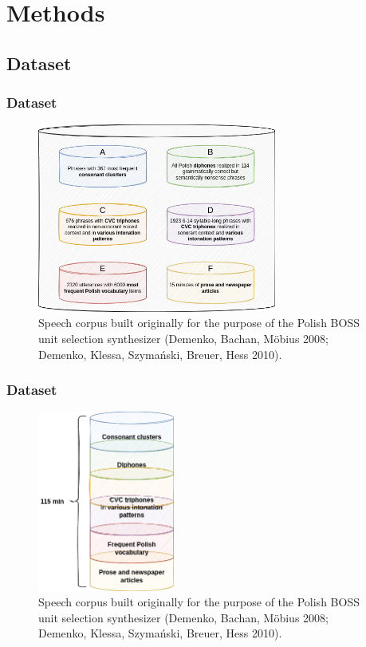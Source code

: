 \documentclass[a4paper,9pt]{beamer}
\theoremstyle{mytheoremstyle}
\begin{document}
\section{Methods}

\subsection{Dataset}

\begin{frame}
\frametitle{Dataset}
\begin{figure}
\begin{center}
  \includegraphics[width=0.7\textwidth]{res/dataset_structure}
\end{center}
	\caption{Speech corpus built originally for the purpose of the Polish BOSS unit selection synthesizer (Demenko, Bachan, M{\"o}bius 2008; Demenko, Klessa, Szyma\'nski, Breuer, Hess 2010).}
\end{figure}
\end{frame}

\begin{frame}
\frametitle{Dataset}
\begin{figure}
\begin{center}
  \includegraphics[width=0.4\textwidth]{res/dataset_structure_simple}
\end{center}
	\caption{Speech corpus built originally for the purpose of the Polish BOSS unit selection synthesizer (Demenko, Bachan, M{\"o}bius 2008; Demenko, Klessa, Szyma\'nski, Breuer, Hess 2010).}
\end{figure}
\end{frame}
\end{document}
